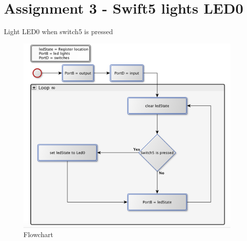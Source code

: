 \documentclass[a4paper, 12pt]{article}
\begin{document}
\section{Assignment 3 - Swift5 lights LED0}
\begin{algorithm}
\begin{algorithmic}
\Repeat
{} 
\EndIf
{}
\Until{$\infty$}
\EndProcedure
\caption{Light LED0 when switch5 is pressed}
\label{assign2.pseudo}
\end{algorithmic}
\end{algorithm}

\begin{figure}[h]
\includegraphics[scale=0.5]{Flowchart_pics/assignment3_pic.png} 
\caption{Flowchart}
\label{}
\end{figure}
\newpage
\end{document}
